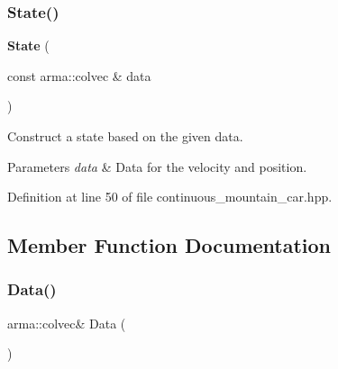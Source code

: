 \mbox{\label{classmlpack_1_1rl_1_1ContinuousMountainCar_1_1State_a8bc7967f6d91a3c94f9b3f502297a926}} 
\subsubsection{State()\hspace{0.1cm}{\footnotesize\ttfamily [2/2]}}
{\footnotesize\ttfamily \textbf{ State} (\begin{DoxyParamCaption}\item[{const arma\+::colvec \&}]{data }\end{DoxyParamCaption})\hspace{0.3cm}{\ttfamily [inline]}}



Construct a state based on the given data. 


\begin{DoxyParams}{Parameters}
{\em data} & Data for the velocity and position. \\
\hline
\end{DoxyParams}


Definition at line 50 of file continuous\+\_\+mountain\+\_\+car.\+hpp.



\subsection{Member Function Documentation}
\mbox{\label{classmlpack_1_1rl_1_1ContinuousMountainCar_1_1State_ad6a50c7b5fced2e931d9a4b4ff989ed6}} 
\subsubsection{Data()}
{\footnotesize\ttfamily arma\+::colvec\& Data (\begin{DoxyParamCaption}{ }\end{DoxyParamCaption})\hspace{0.3cm}{\ttfamily [inline]}}




